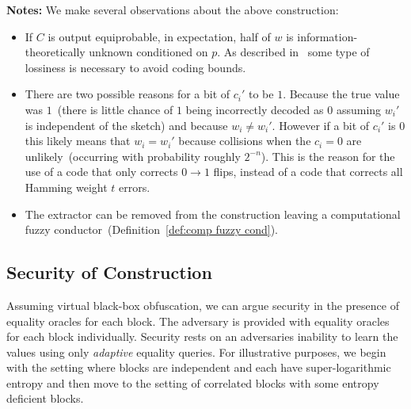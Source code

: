 \documentclass[11pt]{article}
\newcommand{\defref}[1]{\mbox{Definition~\ref{#1}}}
\begin{document}
\textbf{Notes:}  We make several observations about the above construction:
\begin{itemize}
\item If $C$ is output equiprobable, in expectation, half of $w$ is information-theoretically unknown conditioned on $p$.  As described in~\cite[Section 3.3]{fuller2013computational} some type of lossiness is necessary to avoid coding bounds.
\item There are two possible reasons for a bit of $c_i'$ to be $1$.  Because the true value was $1$~(there is little chance of $1$ being incorrectly decoded as $0$ assuming $w_i'$ is independent of the sketch) and because $w_i \neq w_i'$.  However if a bit of $c_i'$ is $0$ this likely means that $w_i=w_i'$ because collisions when the $c_i=0$ are unlikely~(occurring with probability roughly $2^{-n}$).  This is the reason for the use of a code that only corrects $0\rightarrow 1$ flips, instead of a code that corrects all Hamming weight $t$ errors.
\item The extractor can be removed from the construction leaving a computational fuzzy conductor~(\defref{def:comp fuzzy cond}).
\end{itemize}

\subsection{Security of Construction}
Assuming virtual black-box obfuscation, we can argue security in the presence of equality oracles for each block.  The adversary is provided with equality oracles for each block individually.  Security rests on an adversaries inability to learn the values using only \emph{adaptive} equality queries.  For illustrative purposes, we begin with the setting where blocks are independent and each have super-logarithmic entropy and then move to the setting of correlated blocks with some entropy deficient blocks.
\end{document}
